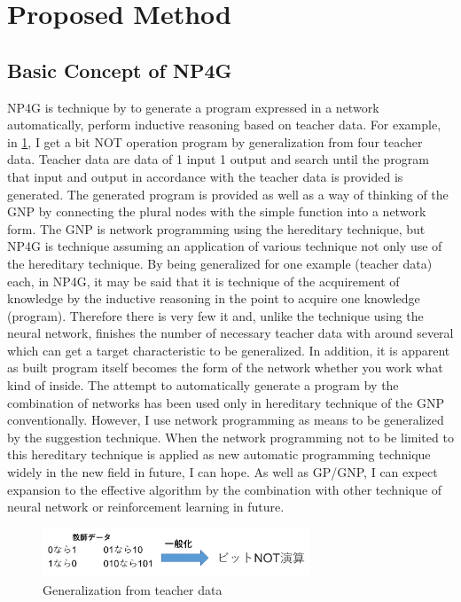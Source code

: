 \documentclass{article}
\begin{document}
\section {Proposed Method}
\subsection{Basic Concept of NP4G}
NP4G is technique by to generate a program expressed in a network automatically, perform inductive reasoning based on teacher data.
For example, in \ref{fig:summary}, I get a bit NOT operation program by generalization from four teacher data.
Teacher data are data of 1 input 1 output and search until the program that input and output in accordance with the teacher data is provided is generated.
The generated program is provided as well as a way of thinking of the GNP by connecting the plural nodes with the simple function into a network form.
The GNP is network programming using the hereditary technique, but NP4G is technique assuming an application of various technique not only use of the hereditary technique.
By being generalized for one example (teacher data) each, in NP4G, it may be said that it is technique of the acquirement of knowledge by the inductive reasoning in the point to acquire one knowledge (program).
Therefore there is very few it and, unlike the technique using the neural network, finishes the number of necessary teacher data with around several which can get a target characteristic to be generalized.
In addition, it is apparent as built program itself becomes the form of the network whether you work what kind of inside.
The attempt to automatically generate a program by the combination of networks has been used only in hereditary technique of the GNP conventionally.
However, I use network programming as means to be generalized by the suggestion technique.
When the network programming not to be limited to this hereditary technique is applied as new automatic programming technique widely in the new field in future, I can hope.
As well as GP/GNP, I can expect expansion to the effective algorithm by the combination with other technique of neural network or reinforcement learning in future.
\begin{figure}[t]
\begin{center}
\includegraphics[width=80mm]{summary.png}
\end{center}
\caption {Generalization from teacher data}
\label{fig:summary}
\end{figure}
\end{document}
